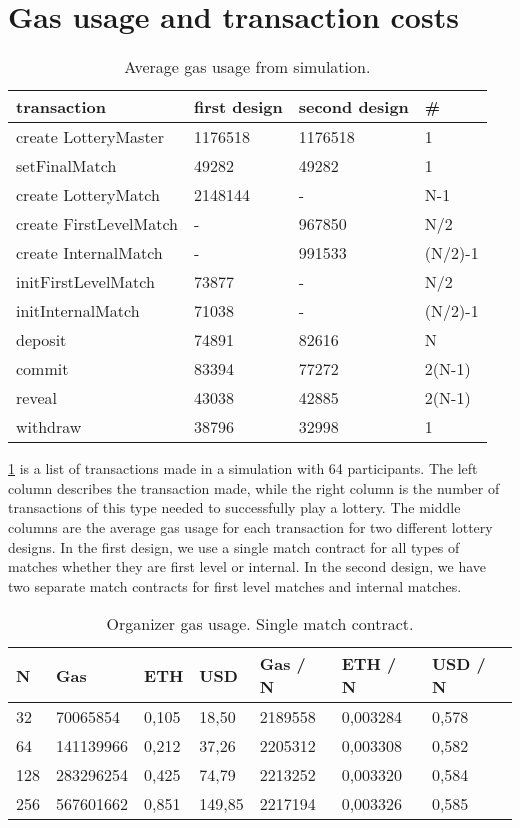\section{Gas usage and transaction costs}
\label{sec:gas}

\begin{table}[h]
\centering
\caption{Average gas usage from simulation.}
\label{tab:gas-usage}
\begin{tabular}{|l|l|l|l|}
\hline

transaction & first design & second design & \# \\ \hline
create LotteryMaster & 1176518 & 1176518 & 1 \\ \hline
setFinalMatch & 49282 & 49282 & 1 \\ \hline
create LotteryMatch & 2148144 & - & N-1 \\ \hline
create FirstLevelMatch & - & 967850 & N/2 \\ \hline
create InternalMatch & - & 991533 & (N/2)-1 \\ \hline
initFirstLevelMatch & 73877 & - & N/2 \\ \hline
initInternalMatch & 71038 & - & (N/2)-1 \\ \hline
deposit & 74891 & 82616 & N \\ \hline
commit & 83394 & 77272 & 2(N-1) \\ \hline
reveal & 43038 & 42885 & 2(N-1) \\ \hline
withdraw & 38796 & 32998 & 1 \\ \hline

\end{tabular}
\end{table}

\noindent
\ref{tab:gas-usage} is a list of transactions made in a simulation with 64 participants. The left column describes the transaction made, while the right column is the number of transactions of this type needed to successfully play a lottery. The middle columns are the average gas usage for each transaction for two different lottery designs. In the first design, we use a single match contract for all types of matches whether they are first level or internal. In the second design, we have two separate match contracts for first level matches and internal matches. 

\begin{table}[h]
\centering
\caption{Organizer gas usage. Single match contract.}
\label{tab:org-gas-usage-single}
\begin{tabular}{|l|l|l|l|l|l|l|}
\hline

N & Gas & ETH & USD & Gas / N & ETH / N & USD / N \\ \hline
32 & 70065854 & 0,105 & 18,50 & 2189558 & 0,003284 & 0,578 \\ \hline
64 & 141139966 & 0,212 & 37,26 & 2205312 & 0,003308 & 0,582 \\ \hline
128 & 283296254 & 0,425 & 74,79 & 2213252 & 0,003320 & 0,584 \\ \hline
256 & 567601662 & 0,851 & 149,85 & 2217194 & 0,003326 & 0,585 \\ \hline

\end{tabular}
\end{table}

